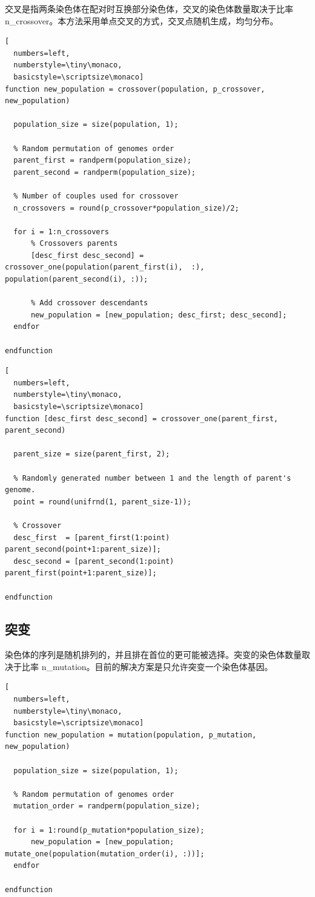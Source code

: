 \documentclass[11pt,a4paper,titlepage]{article}
\begin{document}
交叉是指两条染色体在配对时互换部分染色体，交叉的染色体数量取决于比率 n\_crossover。本方法采用单点交叉的方式，交叉点随机生成，均匀分布。

\begin{lstlisting}[
  numbers=left,
  numberstyle=\tiny\monaco,
  basicstyle=\scriptsize\monaco]
function new_population = crossover(population, p_crossover, new_population)

  population_size = size(population, 1);

  % Random permutation of genomes order 
  parent_first = randperm(population_size);
  parent_second = randperm(population_size);

  % Number of couples used for crossover
  n_crossovers = round(p_crossover*population_size)/2;

  for i = 1:n_crossovers
      % Crossovers parents
      [desc_first desc_second] = crossover_one(population(parent_first(i),  :), population(parent_second(i), :));

      % Add crossover descendants
      new_population = [new_population; desc_first; desc_second];
  endfor

endfunction
\end{lstlisting}

\begin{lstlisting}[
  numbers=left,
  numberstyle=\tiny\monaco,
  basicstyle=\scriptsize\monaco]
function [desc_first desc_second] = crossover_one(parent_first, parent_second)

  parent_size = size(parent_first, 2);

  % Randomly generated number between 1 and the length of parent's genome.
  point = round(unifrnd(1, parent_size-1));

  % Crossover
  desc_first  = [parent_first(1:point)   parent_second(point+1:parent_size)];
  desc_second = [parent_second(1:point)  parent_first(point+1:parent_size)];

endfunction
\end{lstlisting}

\subsection{突变}

染色体的序列是随机排列的，并且排在首位的更可能被选择。突变的染色体数量取决于比率 n\_mutation。目前的解决方案是只允许突变一个染色体基因。

\begin{lstlisting}[
  numbers=left,
  numberstyle=\tiny\monaco,
  basicstyle=\scriptsize\monaco]
function new_population = mutation(population, p_mutation, new_population)

  population_size = size(population, 1);

  % Random permutation of genomes order 
  mutation_order = randperm(population_size);

  for i = 1:round(p_mutation*population_size);
      new_population = [new_population; mutate_one(population(mutation_order(i), :))];
  endfor

endfunction
\end{lstlisting}
\end{document}
